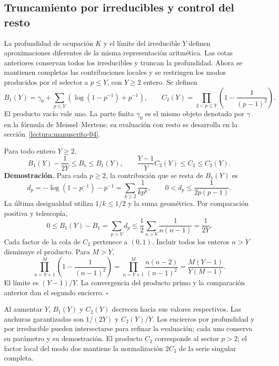 \subsection{Truncamiento por irreducibles y control del resto}
\label{ix-add:corte-primos}

La profundidad de ocupación $K$ y el límite del irreducible $Y$ definen
aproximaciones diferentes de la misma representación aritmética. Las cotas
anteriores conservan todos los irreducibles y truncan la profundidad. Ahora
se mantienen completas las contribuciones locales y se restringen los modos
producidos por el selector a $p\leq Y$, con $Y\geq2$ entero. Se definen
\[
 B_1(Y)=\gamma_0+\sum_{p\leq Y}
       \left(\log(1-p^{-1})+p^{-1}\right),\qquad
 C_2(Y)=\prod_{2<p\leq Y}\left(1-\frac1{(p-1)^2}\right).
\]
El producto vacío vale uno. La parte finita $\gamma_0$ es el mismo objeto
denotado por $\gamma$ en la fórmula de Meissel--Mertens; su evaluación con
resto se desarrolla en la sección~\ref{lectura:manuscrito-04}.

Para todo entero $Y\geq2$,
\[
 B_1(Y)-\frac1{2Y}\leq B_1\leq B_1(Y),\qquad
 \frac{Y-1}{Y}C_2(Y)\leq C_2\leq C_2(Y).
\]
\textbf{Demostración.}
Para cada $p\geq2$, la contribución que se resta de $B_1(Y)$ es
\[
 d_p=-\log(1-p^{-1})-p^{-1}
     =\sum_{k\geq2}\frac1{kp^k},\qquad
 0<d_p\leq\frac1{2p(p-1)}.
\]
La última desigualdad utiliza $1/k\leq1/2$ y la suma geométrica.
Por comparación positiva y telescopía,
\[
 0\leq B_1(Y)-B_1=\sum_{p>Y}d_p
 \leq\frac12\sum_{n>Y}\frac1{n(n-1)}=\frac1{2Y}.
\]
Cada factor de la cola de $C_2$ pertenece a $(0,1)$. Incluir todos los
enteros $n>Y$ disminuye el producto. Para $M>Y$,
\[
 \prod_{n=Y+1}^{M}\left(1-\frac1{(n-1)^2}\right)
 =\prod_{n=Y+1}^{M}\frac{n(n-2)}{(n-1)^2}
 =\frac{M(Y-1)}{Y(M-1)}.
\]
El límite es $(Y-1)/Y$. La convergencia del producto primo y la
comparación anterior dan el segundo encierro. \hfill$\square$

Al aumentar $Y$, $B_1(Y)$ y $C_2(Y)$ decrecen hacia sus valores respectivos.
Las anchuras garantizadas son $1/(2Y)$ y $C_2(Y)/Y$. Los encierros por
profundidad y por irreducible pueden intersectarse para refinar la evaluación;
cada uno conserva su parámetro y su demostración. El producto $C_2$
corresponde al sector $p>2$; el factor local del modo dos mantiene la
normalización $2C_2$ de la serie singular completa.
